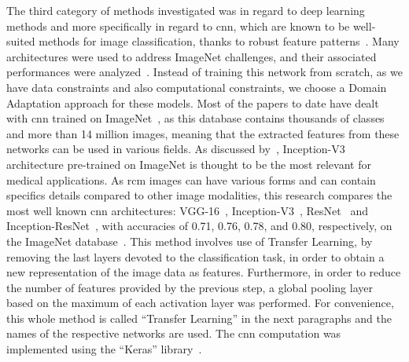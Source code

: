 \documentclass[journal,article,submit,moreauthors,pdftex, applsci]{Definitions/mdpi}
\begin{document}
The third category of methods investigated was in regard to deep learning methods and more specifically in regard to \ac{cnn}, which are known to be well-suited methods for image classification, thanks to robust feature patterns~\cite{Pathan2018}. Many architectures were used to address ImageNet challenges, and their associated performances were analyzed~\cite{Canziani2016}. Instead of training this network from scratch, as we have data constraints and also computational constraints, we choose a Domain Adaptation approach for these models. Most of the papers to date have dealt with \ac{cnn} trained on ImageNet~\cite{Deng2008}, as this database contains thousands of classes and more than 14 million images, meaning that the extracted features from these networks can be used in various fields. As discussed by~\cite{Litjens2017}, Inception-V3 architecture pre-trained on ImageNet is thought to be the most relevant for medical applications. As \ac{rcm} images can have various forms and can contain specifics details compared to other image modalities, this research compares the most well known \ac{cnn} architectures: VGG-16~\cite{Simonyan2014}, Inception-V3~\cite{Szegedy2015}, ResNet~\cite{He2016} and Inception-ResNet~\cite{Szegedy2017}, with accuracies of 0.71, 0.76, 0.78, and 0.80, respectively, on the ImageNet database~\cite{Canziani2016}. This method involves use of Transfer Learning, by removing the last layers devoted to the classification task, in order to obtain a new representation of the image data as features. Furthermore, in order to reduce the number of features provided by the previous step, a global pooling layer based on the maximum of each activation layer was performed. For convenience, this whole method is called “Transfer Learning” in the next paragraphs and the names of the respective networks are used. The \ac{cnn} computation was implemented using the “Keras” library~\cite{chollet2015keras}.\par

\end{document}
